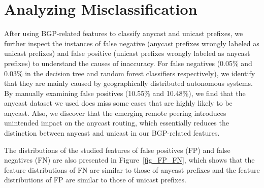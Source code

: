
\section{Analyzing Misclassification}
\label{sec:inaccu}

After using BGP-related features to classify anycast and unicast prefixes, we
further inspect the instances of false negative (anycast prefixes wrongly
labeled as unicast prefixes) and false positive (unicast prefixes wrongly
labeled as anycast prefixes) to understand the causes of inaccuracy. For false
negatives (0.05\% and 0.03\% in the decision tree and random forest classifiers
respectively), we identify that they are mainly caused by geographically distributed
autonomous systems.  By manually examining false positives
(10.55\% and 10.48\%), we find that the
anycast dataset we used does miss some cases that are highly likely to be
anycast. Also, we discover that the emerging remote peering introduces
unintended impact on the anycast routing, which essentially reduces the
distinction between anycast and unicast in our BGP-related features.

The distributions of the studied features of false positives (FP) and false
negatives (FN) are also presented in Figure~\ref{fig_FP_FN}, which  shows that
the feature distributions of FN are similar to those of anycast prefixes and the
feature distributions of FP are similar to those of unicast prefixes.

